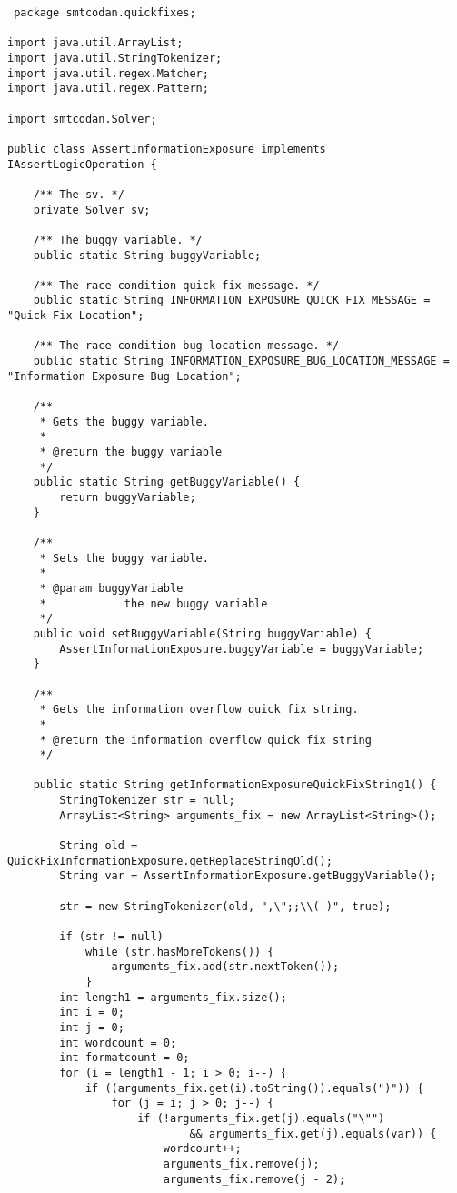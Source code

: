 \begin{lstlisting}
 package smtcodan.quickfixes;

import java.util.ArrayList;
import java.util.StringTokenizer;
import java.util.regex.Matcher;
import java.util.regex.Pattern;

import smtcodan.Solver;

public class AssertInformationExposure implements IAssertLogicOperation {

	/** The sv. */
	private Solver sv;

	/** The buggy variable. */
	public static String buggyVariable;

	/** The race condition quick fix message. */
	public static String INFORMATION_EXPOSURE_QUICK_FIX_MESSAGE = "Quick-Fix Location";

	/** The race condition bug location message. */
	public static String INFORMATION_EXPOSURE_BUG_LOCATION_MESSAGE = "Information Exposure Bug Location";

	/**
	 * Gets the buggy variable.
	 * 
	 * @return the buggy variable
	 */
	public static String getBuggyVariable() {
		return buggyVariable;
	}

	/**
	 * Sets the buggy variable.
	 * 
	 * @param buggyVariable
	 *            the new buggy variable
	 */
	public void setBuggyVariable(String buggyVariable) {
		AssertInformationExposure.buggyVariable = buggyVariable;
	}

	/**
	 * Gets the information overflow quick fix string.
	 * 
	 * @return the information overflow quick fix string
	 */

	public static String getInformationExposureQuickFixString1() {
		StringTokenizer str = null;
		ArrayList<String> arguments_fix = new ArrayList<String>();

		String old = QuickFixInformationExposure.getReplaceStringOld();
		String var = AssertInformationExposure.getBuggyVariable();

		str = new StringTokenizer(old, ",\";;\\( )", true);

		if (str != null)
			while (str.hasMoreTokens()) {
				arguments_fix.add(str.nextToken());
			}
		int length1 = arguments_fix.size();
		int i = 0;
		int j = 0;
		int wordcount = 0;
		int formatcount = 0;
		for (i = length1 - 1; i > 0; i--) {
			if ((arguments_fix.get(i).toString()).equals(")")) {
				for (j = i; j > 0; j--) {
					if (!arguments_fix.get(j).equals("\"")
							&& arguments_fix.get(j).equals(var)) {
						wordcount++;
						arguments_fix.remove(j);
						arguments_fix.remove(j - 2);


\end{lstlisting}
